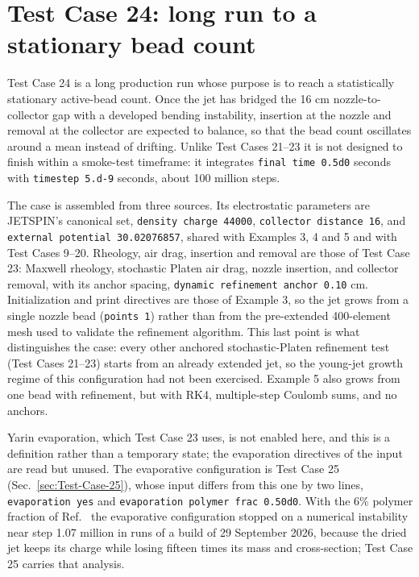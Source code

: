 \section{Test Case 24: long run to a stationary bead count}

Test Case 24 is a long production run whose purpose is to reach a
statistically stationary active-bead count.  Once the jet has bridged the
16 cm nozzle-to-collector gap with a developed bending instability, insertion
at the nozzle and removal at the collector are expected to balance, so that
the bead count oscillates around a mean instead of drifting.  Unlike Test
Cases 21--23 it is not designed to finish within a smoke-test timeframe: it
integrates \texttt{final time 0.5d0} seconds with \texttt{timestep 5.d-9}
seconds, about 100 million steps.

The case is assembled from three sources.  Its electrostatic parameters are
JETSPIN's canonical set, \texttt{density charge 44000},
\texttt{collector distance 16}, and \texttt{external potential 30.02076857},
shared with Examples 3, 4 and 5 and with Test Cases 9--20.  Rheology,
air drag, insertion and removal are those of Test Case 23: Maxwell rheology,
stochastic Platen air drag, nozzle insertion, and collector removal, with
its anchor spacing, \texttt{dynamic refinement anchor 0.10} cm.
Initialization and print directives are those of Example 3, so the jet grows
from a single nozzle bead (\texttt{points 1}) rather than from the
pre-extended 400-element mesh used to validate the refinement algorithm.  This
last point is what distinguishes the case: every other anchored
stochastic-Platen refinement test (Test Cases 21--23) starts from an already
extended jet, so the young-jet growth regime of this configuration had not
been exercised.  Example 5 also grows from one bead with refinement, but
with RK4, multiple-step Coulomb sums, and no anchors.

Yarin evaporation, which Test Case 23 uses, is not enabled here, and this is a
definition rather than a temporary state; the evaporation directives of the
input are read but unused.  The evaporative configuration is Test Case 25
(Sec.~\ref{sec:Test-Case-25}), whose input differs from this one by two
lines, \texttt{evaporation yes} and \texttt{evaporation polymer frac 0.50d0}.
With the 6\% polymer fraction of Ref.~\cite{yarin2001bending} the evaporative
configuration stopped on a numerical instability near step 1.07 million in
runs of a build of 29 September 2026, because the dried jet keeps its charge
while losing fifteen times its mass and cross-section; Test Case 25 carries
that analysis.

